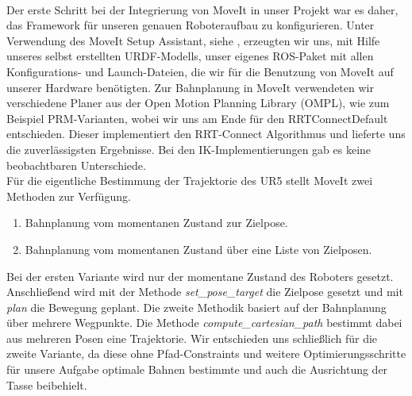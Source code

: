\newline \\
Der erste Schritt bei der Integrierung von MoveIt in unser Projekt war es daher, das Framework für unseren genauen Roboteraufbau zu konfigurieren. Unter Verwendung des MoveIt Setup Assistant, siehe \cite{MoveItAssistant}, erzeugten wir uns, mit Hilfe unseres selbst erstellten URDF-Modells, unser eigenes ROS-Paket mit allen Konfigurations- und Launch-Dateien, die wir für die Benutzung von MoveIt auf unserer Hardware benötigten.
\newline
Zur Bahnplanung in MoveIt verwendeten wir verschiedene Planer aus der Open Motion Planning Library (OMPL), wie zum Beispiel PRM-Varianten, wobei wir uns am Ende für den RRTConnectDefault entschieden. Dieser implementiert den RRT-Connect Algorithmus und lieferte uns die zuverlässigsten Ergebnisse. Bei den IK-Implementierungen gab es keine beobachtbaren Unterschiede.
\newline \\
Für die eigentliche Bestimmung der Trajektorie des UR5 stellt MoveIt zwei Methoden zur Verfügung.
\begin{enumerate}
	\item Bahnplanung vom momentanen Zustand zur Zielpose.
	\item Bahnplanung vom momentanen Zustand über eine Liste von Zielposen.
\end{enumerate}
Bei der ersten Variante wird nur der momentane Zustand des Roboters gesetzt. Anschließend wird mit der Methode \textit{set\_pose\_target} die Zielpose gesetzt und mit \textit{plan} die Bewegung geplant. Die zweite Methodik basiert auf der Bahnplanung über mehrere Wegpunkte. Die Methode \textit{compute\_cartesian\_path} bestimmt dabei aus mehreren Posen eine Trajektorie. Wir entschieden uns schließlich für die zweite Variante, da diese ohne Pfad-Constraints und weitere Optimierungsschritte für unsere Aufgabe optimale Bahnen bestimmte und auch die Ausrichtung der Tasse beibehielt.

